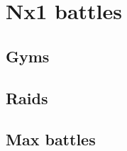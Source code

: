 \chapter{Nx1 battles}
\label{chap:nx1}

\section{Gyms}
\label{section:gyms}

\section{Raids}
\label{section:raids}

\section{Max battles}
\label{section:maxbattles}
